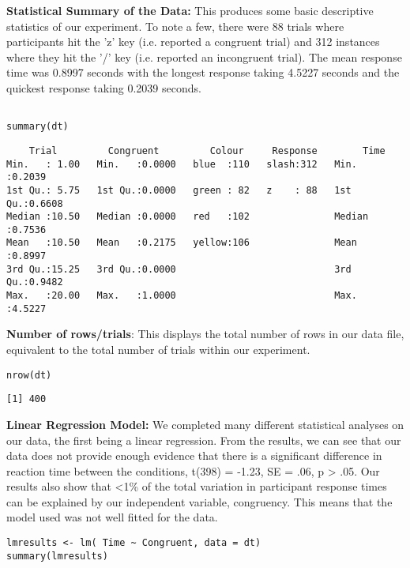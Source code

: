\documentclass{article}
\begin{document}
\vspace{2em} \textbf{Statistical Summary of the Data:} This produces some basic descriptive statistics of our experiment. To note a few, there were 88 trials where participants hit the 'z' key (i.e. reported a congruent trial) and 312 instances where they hit the '/' key (i.e. reported an incongruent trial). The mean response time was 0.8997 seconds with the longest response taking 4.5227 seconds and the quickest response taking 0.2039 seconds.
\begin{verbatim}

summary(dt)

\end{verbatim}

\begin{verbatim}
    Trial         Congruent         Colour     Response        Time       
Min.   : 1.00   Min.   :0.0000   blue  :110   slash:312   Min.   :0.2039  
1st Qu.: 5.75   1st Qu.:0.0000   green : 82   z    : 88   1st Qu.:0.6608  
Median :10.50   Median :0.0000   red   :102               Median :0.7536  
Mean   :10.50   Mean   :0.2175   yellow:106               Mean   :0.8997  
3rd Qu.:15.25   3rd Qu.:0.0000                            3rd Qu.:0.9482  
Max.   :20.00   Max.   :1.0000                            Max.   :4.5227
\end{verbatim}

\textbf{Number of rows/trials}: This displays the total number of rows in our data file, equivalent to the total number of trials within our experiment.
\begin{verbatim}
nrow(dt)
\end{verbatim}

\begin{verbatim}
[1] 400
\end{verbatim}


\vspace{2em} \textbf{Linear Regression Model:} We completed many different statistical analyses on our data, the first being a linear regression. From the results, we can see that our data does not provide enough evidence that there is a significant difference in reaction time between the conditions, t(398) = -1.23, SE = .06, p > .05. Our results also show that <1\% of the total variation in participant response times can be explained by our independent variable, congruency. This means that the model used was not well fitted for the data.
\begin{verbatim}
lmresults <- lm( Time ~ Congruent, data = dt)
summary(lmresults)
\end{verbatim}
\end{document}
